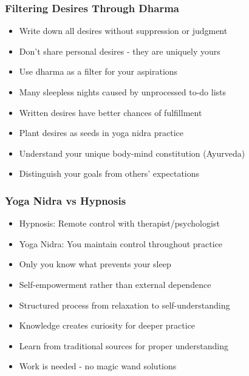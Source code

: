 \begin{frame}[fragile]\frametitle{Filtering Desires Through Dharma}
      \begin{itemize}
	\item Write down all desires without suppression or judgment
	\item Don't share personal desires - they are uniquely yours
	\item Use dharma as a filter for your aspirations
	\item Many sleepless nights caused by unprocessed to-do lists
	\item Written desires have better chances of fulfillment
	\item Plant desires as seeds in yoga nidra practice
	\item Understand your unique body-mind constitution (Ayurveda)
	\item Distinguish your goals from others' expectations
	  \end{itemize}
\end{frame}

\begin{frame}[fragile]\frametitle{Yoga Nidra vs Hypnosis}
      \begin{itemize}
	\item Hypnosis: Remote control with therapist/psychologist
	\item Yoga Nidra: You maintain control throughout practice
	\item Only you know what prevents your sleep
	\item Self-empowerment rather than external dependence
	\item Structured process from relaxation to self-understanding
	\item Knowledge creates curiosity for deeper practice
	\item Learn from traditional sources for proper understanding
	\item Work is needed - no magic wand solutions
	  \end{itemize}
\end{frame}

